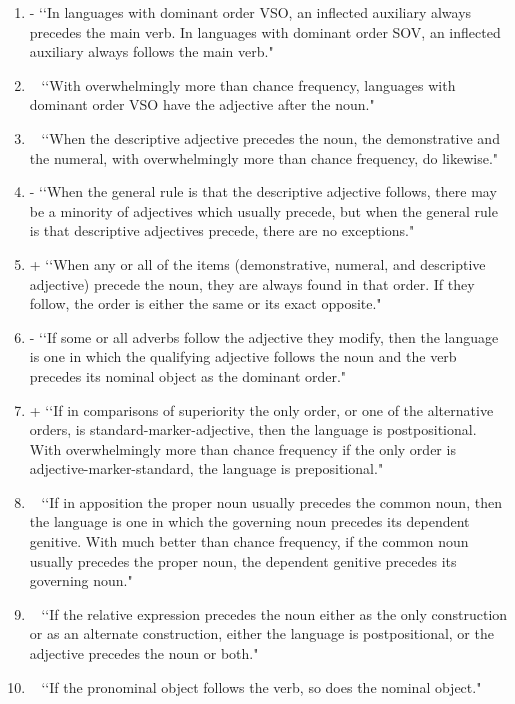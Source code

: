 \begin{enumerate}
\item -  \lq\lq In languages with dominant order VSO, an inflected auxiliary always precedes the main verb. In languages with dominant order SOV, an inflected auxiliary always follows the main verb." 

\item ~  \lq\lq With overwhelmingly more than chance frequency, languages with dominant order VSO have the adjective after the noun." 

\item ~  \lq\lq When the descriptive adjective precedes the noun, the demonstrative and the numeral, with overwhelmingly more than chance frequency, do likewise." 

\item -  \lq\lq When the general rule is that the descriptive adjective follows, there may be a minority of adjectives which usually precede, but when the general rule is that descriptive adjectives precede, there are no exceptions." 

\item +  \lq\lq When any or all of the items (demonstrative, numeral, and descriptive adjective) precede the noun, they are always found  in that order. If they follow, the order is either the same or its exact opposite." 

\item -  \lq\lq If some or all adverbs follow the adjective they modify, then the language is one in which the qualifying adjective follows the noun and the verb precedes its nominal object as the dominant order." 

\item +  \lq\lq If in comparisons of superiority the only order, or one of the alternative orders, is standard-marker-adjective, then the language is postpositional. With overwhelmingly more than chance frequency if the only order is adjective-marker-standard, the language is prepositional." 

\item ~  \lq\lq If in apposition the proper noun usually precedes the common noun, then the language is one in which the governing noun precedes its dependent genitive. With much better than chance frequency, if the common noun usually precedes the proper noun, the dependent genitive precedes its governing noun." 

\item ~  \lq\lq If the relative expression precedes the noun either as the only construction or as an alternate construction, either the language is postpositional, or the adjective precedes the noun or both." 

\item ~  \lq\lq If the pronominal object follows the verb, so does the nominal object." 
\end{enumerate}

